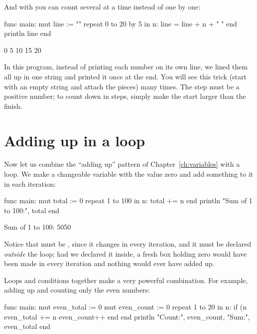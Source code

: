 And with  you can count several at a time instead of one by one:

\begin{salamcode}
func main:
    mut line := ""
    repeat 0 to 20 by 5 in n:
        line = line + n + " "
    end
    println line
end
\end{salamcode}

\begin{salamout}
0 5 10 15 20
\end{salamout}

In this program, instead of printing each number on its own line, we lined
them all up in one string and printed it once at the end. You will see this
trick (start with an empty string and attach the pieces) many times. The
step must be a positive number; to count down in steps, simply make the
start larger than the finish.

\section{Adding up in a loop}

Now let us combine the ``adding up'' pattern of Chapter~\ref{ch:variables}
with a loop. We make a changeable variable with the value zero and add
something to it in each iteration:

\begin{salamcode}
func main:
    mut total := 0
    repeat 1 to 100 in n:
        total += n
    end
    println "Sum of 1 to 100:", total
end
\end{salamcode}

\begin{salamout}
Sum of 1 to 100: 5050
\end{salamout}

Notice that  must be , since it changes in every
iteration, and it must be declared \emph{outside} the loop; had we declared
it inside, a fresh box holding zero would have been made in every iteration
and nothing would ever have added up.

Loops and conditions together make a very powerful combination. For
example, adding up and counting only the even numbers:

\begin{salamcode}
func main:
    mut even_total := 0
    mut even_count := 0
    repeat 1 to 20 in n:
        if (n %
            even_total += n
            even_count++
        end
    end
    println "Count:", even_count, "Sum:", even_total
end
\end{salamcode}

